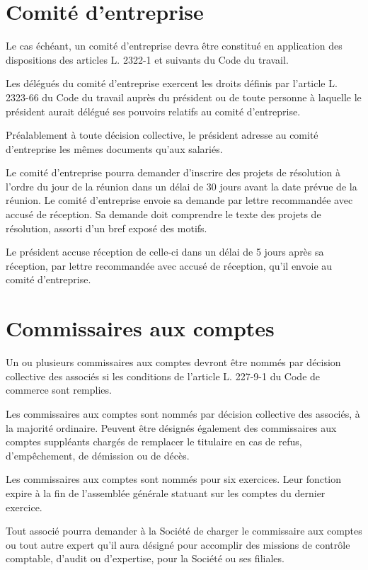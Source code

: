\documentclass[a4paper,12pt]{report}
\begin{document}
\section{Comité d'entreprise}
Le cas échéant, un comité d'entreprise devra être constitué en application des dispositions des articles L. 2322-1 et suivants du Code du travail.

Les délégués du comité d'entreprise exercent les droits définis par l'article L. 2323-66 du Code du travail auprès du président ou de toute personne à laquelle le président aurait délégué ses pouvoirs relatifs au comité d'entreprise.

Préalablement à toute décision collective, le président adresse au comité d'entreprise les mêmes documents qu'aux salariés.

Le comité d'entreprise pourra demander d'inscrire des projets de résolution à l'ordre du jour de la réunion dans un délai de 30 jours avant la date prévue de la réunion. Le comité d'entreprise envoie sa demande par lettre recommandée avec accusé de réception. Sa demande doit comprendre le texte des projets de résolution, assorti d'un bref exposé des motifs.

Le président accuse réception de celle-ci dans un délai de 5 jours après sa réception, par lettre recommandée avec accusé de réception, qu'il envoie au comité d'entreprise.

\section{Commissaires aux comptes}
Un ou plusieurs commissaires aux comptes devront être nommés par décision collective des associés si les conditions de l'article L. 227-9-1 du Code de commerce sont remplies.

Les commissaires aux comptes sont nommés par décision collective des associés, à la majorité ordinaire. Peuvent être désignés également des commissaires aux comptes suppléants chargés de remplacer le titulaire en cas de refus, d'empêchement, de démission ou de décès.

Les commissaires aux comptes sont nommés pour six exercices. Leur fonction expire à la fin de l'assemblée générale statuant sur les comptes du dernier exercice.

Tout associé pourra demander à la Société de charger le commissaire aux comptes ou tout autre expert qu'il aura désigné pour accomplir des missions de contrôle comptable, d'audit ou d'expertise, pour la Société ou ses filiales.
\end{document}
